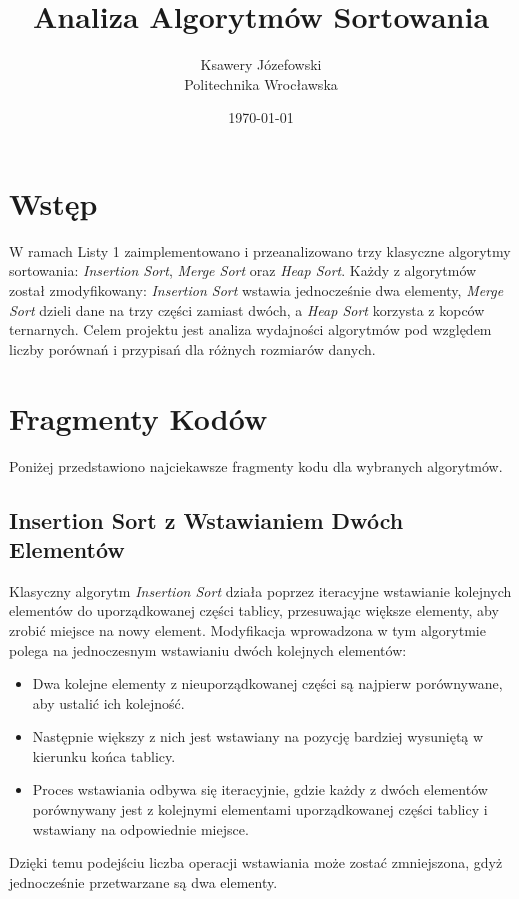 \documentclass[a4paper,12pt]{article}
\title{Analiza Algorytmów Sortowania}
\author{Ksawery Józefowski\\Politechnika Wrocławska}
\date{\today}
\begin{document}
\maketitle

\tableofcontents
\newpage

\section{Wstęp}
W ramach Listy 1 zaimplementowano i przeanalizowano trzy klasyczne algorytmy sortowania: \textit{Insertion Sort}, \textit{Merge Sort} oraz \textit{Heap Sort}. Każdy z algorytmów został zmodyfikowany: \textit{Insertion Sort} wstawia jednocześnie dwa elementy, \textit{Merge Sort} dzieli dane na trzy części zamiast dwóch, a \textit{Heap Sort} korzysta z kopców ternarnych. Celem projektu jest analiza wydajności algorytmów pod względem liczby porównań i przypisań dla różnych rozmiarów danych.

\section{Fragmenty Kodów}
Poniżej przedstawiono najciekawsze fragmenty kodu dla wybranych algorytmów.

\subsection{Insertion Sort z Wstawianiem Dwóch Elementów}
Klasyczny algorytm \textit{Insertion Sort} działa poprzez iteracyjne wstawianie kolejnych elementów do uporządkowanej części tablicy, przesuwając większe elementy, aby zrobić miejsce na nowy element. Modyfikacja wprowadzona w tym algorytmie polega na jednoczesnym wstawianiu dwóch kolejnych elementów:
\begin{itemize}
    \item Dwa kolejne elementy z nieuporządkowanej części są najpierw porównywane, aby ustalić ich kolejność.
    \item Następnie większy z nich jest wstawiany na pozycję bardziej wysuniętą w kierunku końca tablicy.
    \item Proces wstawiania odbywa się iteracyjnie, gdzie każdy z dwóch elementów porównywany jest z kolejnymi elementami uporządkowanej części tablicy i wstawiany na odpowiednie miejsce.
\end{itemize}

Dzięki temu podejściu liczba operacji wstawiania może zostać zmniejszona, gdyż jednocześnie przetwarzane są dwa elementy.
\end{document}
